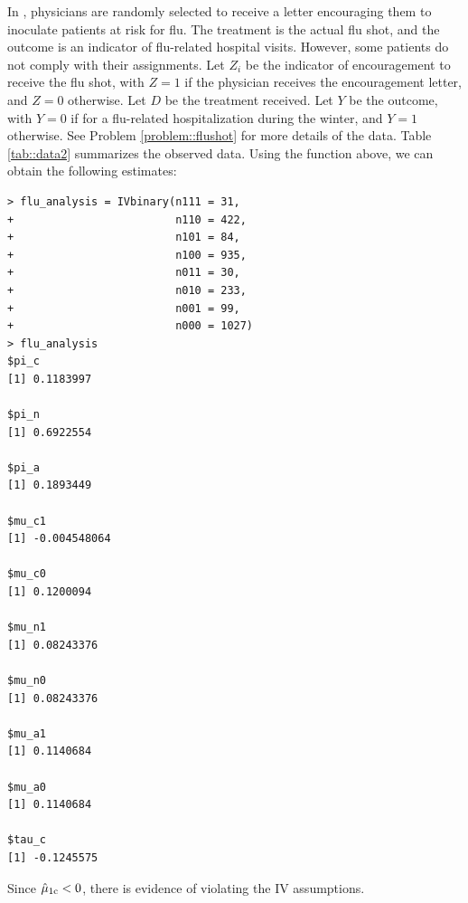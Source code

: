 \begin{example}\label{eg::2-iv-inequalities}
In \citet{hirano2000assessing}, physicians are randomly selected to receive a letter encouraging them to inoculate patients at risk for flu. The treatment is the actual flu shot, and the outcome is an indicator of flu-related hospital visits. However, some patients do not comply with their assignments. Let $Z_i$ be the indicator of encouragement to receive the flu shot, with $Z=1$ if the physician receives the encouragement letter, and  $Z=0$ otherwise. Let $D$ be the treatment received.
Let $Y$ be the outcome, with $Y=0$ if for a flu-related hospitalization during the winter, and $Y=1$ otherwise. See Problem \ref{problem::flushot} for more details of the data. Table \ref{tab::data2} summarizes the observed data.
Using the  function above, we can obtain the following estimates:
\begin{lstlisting}
> flu_analysis = IVbinary(n111 = 31,
+                         n110 = 422,
+                         n101 = 84,
+                         n100 = 935,
+                         n011 = 30,
+                         n010 = 233,
+                         n001 = 99,
+                         n000 = 1027)
> flu_analysis
$pi_c
[1] 0.1183997

$pi_n
[1] 0.6922554

$pi_a
[1] 0.1893449

$mu_c1
[1] -0.004548064

$mu_c0
[1] 0.1200094

$mu_n1
[1] 0.08243376

$mu_n0
[1] 0.08243376

$mu_a1
[1] 0.1140684

$mu_a0
[1] 0.1140684

$tau_c
[1] -0.1245575
\end{lstlisting}
Since $\hat\mu_{1\textup{c}} < 0$, there is evidence of violating the IV assumptions. 
\end{example} 




